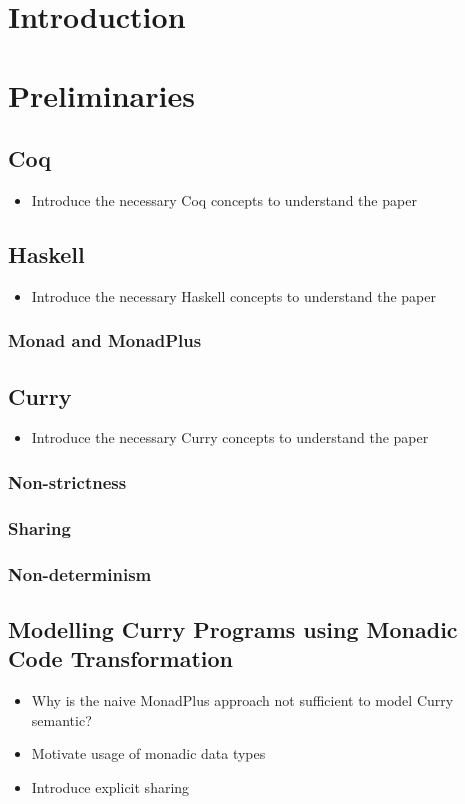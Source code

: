 \documentclass[a4paper, 11pt, fleqn, twoside]{scrreprt}
\begin{document}

\chapter{Introduction}

\chapter{Preliminaries}

\section{Coq}
\label{sec:coqIntro}
\begin{itemize}
\item Introduce the necessary Coq concepts to understand the paper
\end{itemize}

\section{Haskell}
\begin{itemize}
\item Introduce the necessary Haskell concepts to understand the paper
\end{itemize}
\subsection{Monad and MonadPlus}

\section{Curry}
\begin{itemize}
\item Introduce the necessary Curry concepts to understand the paper
\end{itemize}
\subsection{Non-strictness}
\subsection{Sharing}
\subsection{Non-determinism}

\section{Modelling Curry Programs using Monadic Code Transformation}
\begin{itemize}
\item Why is the naive MonadPlus approach not sufficient to model Curry semantic?
\item Motivate usage of monadic data types
\item Introduce explicit sharing
\end{itemize}
\end{document}
